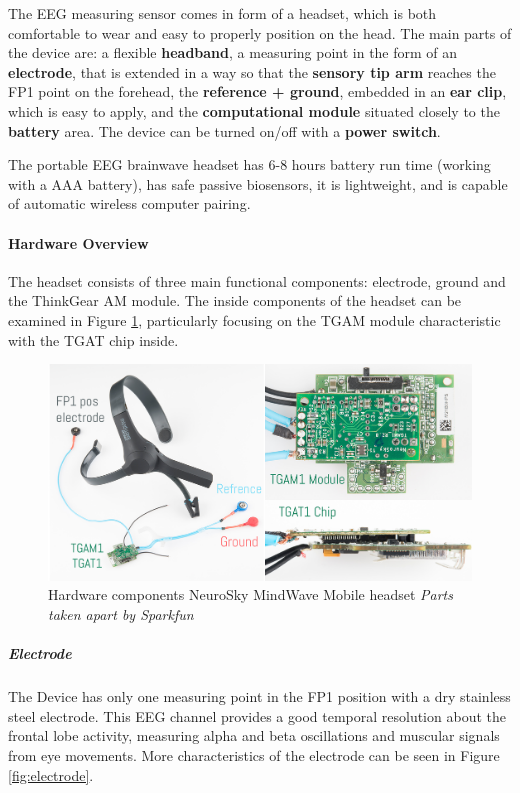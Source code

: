 \documentclass[letterpaper,10pt]{article}
\begin{document}
The EEG measuring sensor comes in form of a headset, which is both comfortable to wear and easy to properly position on the head. The main parts of the device are: a flexible \textbf{headband}, a measuring point in the form of an \textbf{electrode}, that is extended in a way so that the \textbf{sensory tip arm} reaches the FP1 point on the forehead, the  \textbf{reference + ground}, embedded in an \textbf{ear clip}, which is easy to apply, and the \textbf{computational module} situated closely to the \textbf{battery} area. The device can be turned on/off with a \textbf{power switch}.

The portable EEG brainwave headset has 6-8 hours battery run time (working with a  AAA battery), has safe passive biosensors, it is lightweight, and is capable of automatic wireless computer pairing.  \cite{neurosky}

\paragraph{Hardware Overview}

The headset consists of three main functional components: electrode, ground and the ThinkGear AM module. The inside components of the headset can be examined in Figure \ref{fig:inside}, particularly focusing on the TGAM module characteristic with the TGAT chip inside.

\begin{figure}[h]
\centering
\includegraphics[scale=0.7]{hardware.png}
\caption[Hardware components NeuroSky MindWave Mobile headset]{Hardware components NeuroSky MindWave Mobile headset \textit{Parts taken apart by Sparkfun}}
\label{fig:inside}
\end{figure}

\subparagraph{Electrode} The Device has only one measuring point in the FP1 position with a dry stainless steel electrode. This EEG channel provides a good temporal resolution about the frontal lobe activity, measuring alpha and beta oscillations and muscular signals from eye movements. More characteristics of the electrode can be seen in Figure \ref{fig:electrode}.
\end{document}
